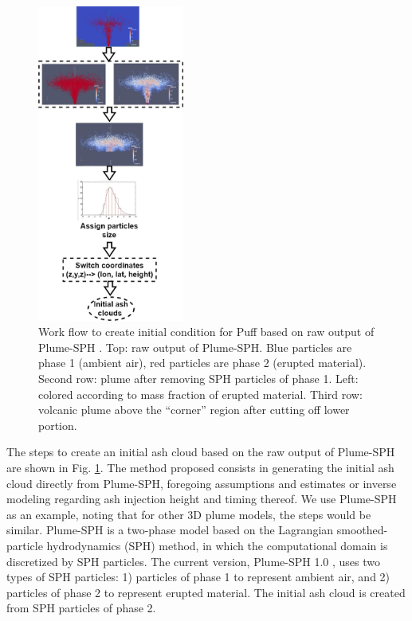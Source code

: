 \documentclass[draft,linenumbers]{agujournal2019}
\begin{document}
\begin{figure}
\center
\includegraphics[width=0.43\textwidth]{Figures/Creat_initial_Ash}
\caption{Work flow to create initial condition for Puff based on raw output of Plume-SPH \citep{cao2018plume}. Top:  raw output of Plume-SPH. Blue particles are phase 1 (ambient air), red particles are  phase 2 (erupted material).  Second row: plume after removing SPH particles of phase 1. Left: colored according to mass fraction of erupted material. Third row:  volcanic plume above the ``corner'' region after cutting off lower portion.}
\label{fig:create-initial-ash-plume-sph}
\end{figure}

The steps to create an initial ash cloud based on the raw output of Plume-SPH are shown in Fig. \ref{fig:create-initial-ash-plume-sph}.
The method proposed consists in generating the initial ash cloud directly from Plume-SPH, foregoing  assumptions and estimates or  inverse modeling regarding ash injection height and timing thereof.
We use Plume-SPH as an example, noting that for other 3D plume models, the steps would be similar. Plume-SPH is a two-phase model based on the Lagrangian smoothed-particle hydrodynamics (SPH) method, in which the computational domain is discretized by SPH particles. The current version, Plume-SPH 1.0 \citep{cao2018plume}, uses two types of SPH particles: 1) particles of phase 1 to represent ambient air, and 2) particles of phase 2 to represent erupted material. The initial ash cloud is created from SPH particles of phase 2.
\end{document}
